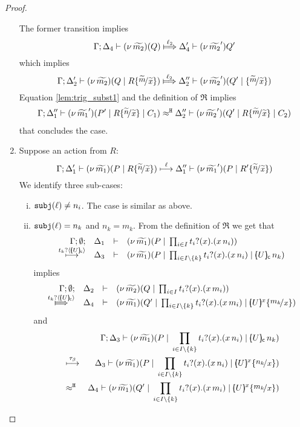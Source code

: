 \begin{proof}
\begin{enumerate}
				The former transition implies
				\[
					\horel{\Gamma}{\Delta_4}{\newsp{\widetilde{m_2}}{Q }}
					{\Hby{\ell_2}}
					{\Delta_4'}{\news{\widetilde{m_2}'}{Q'}}
				\]
				which implies
				\[
					\horel{\Gamma}{\Delta_2'}{\newsp{\widetilde{m_2}}{Q \Par R \subst{\widetilde{m}}{\widetilde{x}}}}
					{\Hby{\ell_2}}
					{\Delta_2''}{\newsp{\widetilde{m_2}'}{Q' \Par \subst{\widetilde{m}}{\widetilde{x}} }}
				\]
				Equation \eqref{lem:trig_subst1} and the definition of $\Re$ implies
				\begin{eqnarray*}
					\horel{\Gamma}{\Delta_1''}{\newsp{\widetilde{m_1}'}{P' \Par R \subst{\widetilde{n}}{\widetilde{x}} \Par C_1}}
					{\hwb}
					{\Delta_2''}{\newsp{\widetilde{m_2}'}{Q' \Par R \subst{\widetilde{m}}{\widetilde{x}} \Par C_2 }}
				\end{eqnarray*}
				that concludes the case.

		\item	Suppose an action from $R$:
		\[
					\horel{\Gamma}{\Delta_1'}{\newsp{\widetilde{m_1}}{P \Par R \subst{\widetilde{n}}{\widetilde{x}}  }}
					{\hby{\ell}}
					{\Delta_1''}{\newsp{\widetilde{m_1}'}{P \Par R' \subst{\widetilde{n}}{\widetilde{x}} }}
				\]
				We identify three sub-cases:
				\begin{enumerate}[i.]
					\item	$\mathtt{subj}(\ell) \not= n_i$. The case is similar as above.

					\item	$\mathtt{subj}(\ell) = n_k$ and $n_k = m_k$.
							From the definition of $\Re$ we get that
							\[
								\mhorel{\Gamma}{\Delta_1}{\newsp{\widetilde{m_1}}{P \Par \prod_{i \in I} \binp{t_i}{x} (\appl{x}{n_i})}}
								{\hby{ \bactinp{t_k}{\omapchar{U}}}}
								{\Delta_3}{}{\newsp{\widetilde{m_1}}{P \Par \prod_{i \in I\backslash{\set{k}}} \binp{t_i}{x} (\appl{x}{n_i}) \Par \appl{\omapchar{U}}{n_k}}}
							\]
							implies
							\[
								\mhorel{\Gamma}{\Delta_2}{\newsp{\widetilde{m_2}}{Q \Par \prod_{i \in I} \binp{t_i}{x} (\appl{x}{m_i})}}
								{\Hby{ \bactinp{t_k}{\omapchar{U}}}}
								{\Delta_4}{}{\newsp{\widetilde{m_1}}{Q' \Par \prod_{i \in I \backslash{\set{k}}} \binp{t_i}{x} (\appl{x}{m_i}) \Par \mapchar{U}{x} \subst{m_k}{x} }}
							\]
							and
							\begin{eqnarray*}
								&& \Gamma; \Delta_3 \proves \newsp{\widetilde{m_1}}{P \Par \prod_{i \in I \backslash{\set{k}}} \binp{t_i}{x} (\appl{x}{n_i}) \Par \appl{\omapchar{U}}{n_k}}
								\\
								&\hby{\tau_{\beta}}&
									\Delta_3 \proves \newsp{\widetilde{m_1}}{P \Par \prod_{i \in I \backslash{\set{k}}} \binp{t_i}{x} (\appl{x}{n_i}) \Par \mapchar{U}{x} \subst{n_k}{x}  }
								\\
								&\hwb&
									\Delta_4 \proves \newsp{\widetilde{m_1}}{Q' \Par \prod_{i \in I \backslash{\set{k}}} \binp{t_i}{x} (\appl{x}{m_i}) \Par \mapchar{U}{x} \subst{m_k}{x}}
							\end{eqnarray*}


\end{enumerate}
\end{enumerate}
\end{proof}
